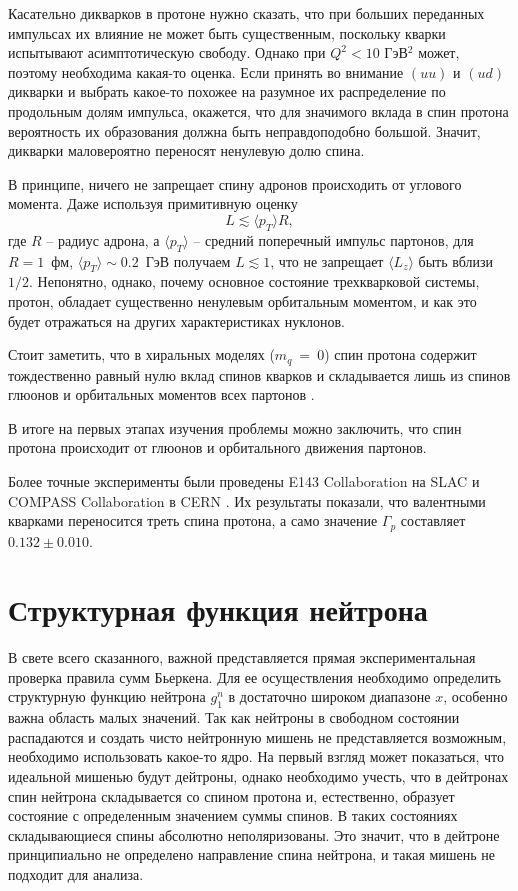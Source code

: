 \documentclass[
	a4paper, 10pt,
	twocolumn
]{article}
\begin{document}
Касательно дикварков в протоне нужно сказать, что при больших переданных импульсах их влияние не может быть существенным, поскольку кварки испытывают асимптотическую свободу. Однако при $Q^2 < 10$ ГэВ$^2$ может, поэтому необходима какая-то оценка. Если принять во внимание $(uu)$ и $(ud)$ дикварки и выбрать какое-то похожее на разумное их распределение по продольным долям импульса, окажется, что для значимого вклада в спин протона вероятность их образования должна быть неправдоподобно большой. Значит, дикварки маловероятно переносят ненулевую долю спина. 

В принципе, ничего не запрещает спину адронов происходить от углового момента. Даже используя примитивную оценку 
$$L \lesssim \langle p_T \rangle R, $$
где $R$ -- радиус адрона, а $\langle p_T \rangle$ -- средний поперечный импульс партонов, для $R=1$~фм, $\langle p_T \rangle \sim 0.2$~ГэВ получаем $L \lesssim 1$, что не запрещает $\langle L_z \rangle$ быть вблизи $1/2$. Непонятно, однако, почему основное состояние трехкварковой системы, протон, обладает существенно ненулевым орбитальным моментом, и как это будет отражаться на других характеристиках нуклонов. 

Стоит заметить, что в хиральных моделях ($m_q~\!\!=~\!\!0$) спин протона содержит тождественно равный нулю вклад спинов кварков и складывается лишь из спинов глюонов и орбитальных моментов всех партонов \cite{Chiral}. 

В итоге на первых этапах изучения проблемы можно заключить, что спин протона происходит от глюонов и орбитального движения партонов. 

Более точные эксперименты были проведены E143 Collaboration \cite{E143} на SLAC и COMPASS Collaboration в CERN \cite{COMPASS}. Их результаты показали, что валентными кварками переносится треть спина протона, а само значение $\Gamma_p$ составляет $0.132\pm0.010$.


\section{Структурная функция нейтрона}
В свете всего сказанного, важной представляется прямая экспериментальная проверка правила сумм Бьеркена. Для ее осуществления необходимо определить структурную функцию нейтрона $g_1^n$ в достаточно широком диапазоне $x$, особенно важна область малых значений. 
Так как нейтроны в свободном состоянии распадаются и создать чисто нейтронную мишень не представляется возможным, необходимо использовать какое-то ядро. 
На первый взгляд может показаться, что идеальной мишенью будут дейтроны, однако необходимо учесть, что в дейтронах спин нейтрона складывается со спином протона и, естественно, образует состояние с определенным значением суммы спинов. В таких состояниях складывающиеся спины абсолютно неполяризованы. Это значит, что в дейтроне принципиально не определено направление спина нейтрона, и такая мишень не подходит для анализа.
\end{document}
